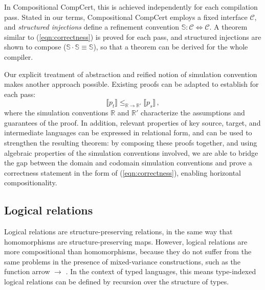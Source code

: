 \documentclass[sigplan,10pt,review,anonymous]{acmart}
\begin{document}
In Compositional CompCert,
this is achieved independently for each compilation pass.
Stated in our terms,
Compositional CompCert
employs a fixed interface $\mathcal{C}$,
and \emph{structured injections} define a refinement convention
$\mathbb{S} : \mathcal{C} \Leftrightarrow \mathcal{C}$.
A theorem similar to (\ref{eqn:correctness}) is proved for each pass,
and structured injections are shown to compose
($\mathbb{S} \cdot \mathbb{S} \equiv \mathbb{S}$),
so that a theorem can be derived for the whole compiler.


Our explicit treatment of abstraction
and reified notion of simulation convention
makes another approach possible.
Existing proofs can be adapted to establish
for each pass:
\begin{equation}
    \label{correctness-alt}
    \llbracket p_t \rrbracket
    \le_{\mathbb{R} \rightarrow \mathbb{R}'}
    \llbracket p_s \rrbracket \,,
\end{equation}
where the simulation conventions $\mathbb{R}$ and $\mathbb{R}'$
characterize the assumptions and guarantees of the proof.
In addition,
relevant properties of key source, target, and intermediate languages
can be expressed in relational form,
and can be used to strengthen the resulting theorem:
by composing these proofs together,
and using algebraic properties of
the simulation conventions involved,
we are able to bridge the gap
between the domain and codomain simulation conventions
and prove a correctness statement
in the form of (\ref{eqn:correctness}),
enabling horizontal compositionality.



\subsection{Logical relations} %

Logical relations are structure-preserving relations,
in the same way that homomorphisms are structure-preserving maps.
However,
logical relations are more compositional than homomorphisms,
because they do not suffer from the same problems
in the presence of mixed-variance constructions,
such as the function arrow $\rightarrow$ \cite{lrp}.
In the context of typed languages,
this means type-indexed logical relations
can be defined by recursion over the structure of types.
\end{document}
